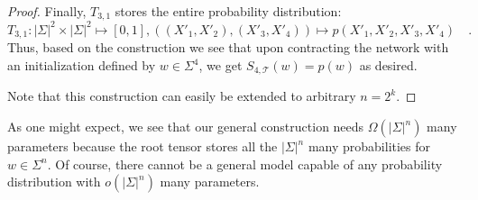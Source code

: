 \documentclass[../../main.tex]{subfiles}
\begin{document}
\begin{proof}
    Finally, $T_{3, 1}$ stores the entire probability distribution:
    \[
        T_{3, 1}: |\Sigma|^2 \times |\Sigma|^2 \mapsto [0, 1], ((X'_1, X'_2), (X'_3, X'_4)) \mapsto p(X'_1, X'_2, X'_3, X'_4) \quad .
    \]
    Thus, based on the construction we see that upon contracting the network with an initialization defined by $w \in \Sigma^4$, we get $S_{4, \mathcal{T}}(w) = p(w)$ as desired.

    Note that this construction can easily be extended to arbitrary $n = 2^k$.
    \end{proof}

    As one might expect, we see that our general construction needs $\Omega(|\Sigma|^n)$ many parameters because the root tensor stores all the $|\Sigma|^n$ many probabilities for $w \in \Sigma^n$. Of course, there cannot be a general model capable of any probability distribution with $o(|\Sigma|^n)$ many parameters.
\end{document}
